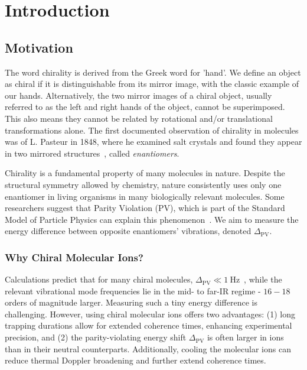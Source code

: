 \chapter{Introduction}

\section{Motivation}

The word chirality is derived from the Greek word for 'hand'. We define an object as chiral if it is distinguishable from its mirror image, with the classic example of our hands. Alternatively, the two mirror images of a chiral object, usually referred to as the left and right hands of the object, cannot be superimposed. This also means they cannot be related by rotational and/or translational transformations alone. The first documented observation of chirality in molecules was of L. Pasteur in 1848, where he examined salt crystals and found they appear in two mirrored structures~\cite{PasteurChirality}, called \emph{enantiomers}.

Chirality is a fundamental property of many molecules in nature. Despite the structural symmetry allowed by chemistry, nature consistently uses only one enantiomer in living organisms in many biologically relevant molecules. Some researchers suggest that Parity Violation (PV), which is part of the Standard Model of Particle Physics can explain this phenomenon~\cite{QuackChiralitySM}. We aim to measure the energy difference between opposite enantiomers' vibrations, denoted $\Delta_\mathrm{PV}$.

\subsection{Why Chiral Molecular Ions?}

Calculations predict that for many chiral molecules, $\Delta_\mathrm{PV} \ll 1\ \mathrm{Hz}$~\cite{DeltaPVCalculationExample}, while the relevant vibrational mode frequencies lie in the mid- to far-IR regime - $16-18$ orders of magnitude larger. Measuring such a tiny energy difference is challenging. However, using chiral molecular ions offers two advantages: (1) long trapping durations allow for extended coherence times, enhancing experimental precision, and (2) the parity-violating energy shift $\Delta_\mathrm{PV}$ is often larger in ions than in their neutral counterparts. Additionally, cooling the molecular ions can reduce thermal Doppler broadening and further extend coherence times.

